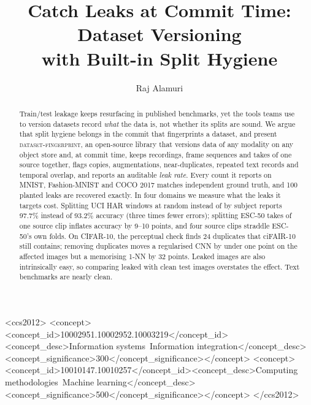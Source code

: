 \documentclass[sigconf,nonacm]{acmart}
\begin{document}
\title{Catch Leaks at Commit Time: Dataset Versioning\\with Built-in Split Hygiene}

\author{Raj Alamuri}

\begin{abstract}
Train/test leakage keeps resurfacing in published benchmarks, yet the tools teams use to version
datasets record \emph{what} the data is, not whether its splits are sound. We argue that split
hygiene belongs in the commit that fingerprints a dataset, and present \textsc{dataset-fingerprint},
an open-source library that versions data of any modality on any object store and, at commit time,
keeps recordings, frame sequences and takes of one source together, flags copies, augmentations,
near-duplicates, repeated text records and temporal overlap, and reports an auditable \emph{leak rate}.
Every count it reports on MNIST, Fashion-MNIST and COCO 2017 matches independent ground truth, and 100
planted leaks are recovered exactly. In four domains we measure what the leaks it targets cost.
Splitting UCI HAR windows at random instead of by subject reports 97.7\% instead of 93.2\% accuracy
(three times fewer errors); splitting ESC-50 takes of one source clip inflates accuracy by 9--10 points,
and four source clips straddle ESC-50's own folds. On CIFAR-10, the perceptual check finds 24 duplicates
that ciFAIR-10 still contains; removing duplicates moves a regularised CNN by under one point on the
affected images but a memorising 1-NN by 32 points. Leaked images are also intrinsically easy, so
comparing leaked with clean test images overstates the effect. Text benchmarks are nearly clean.
\end{abstract}

\begin{CCSXML}
<ccs2012>
<concept><concept_id>10002951.10002952.10003219</concept_id><concept_desc>Information systems~Information integration</concept_desc><concept_significance>300</concept_significance></concept>
<concept><concept_id>10010147.10010257</concept_id><concept_desc>Computing methodologies~Machine learning</concept_desc><concept_significance>500</concept_significance></concept>
</ccs2012>
\end{CCSXML}

\maketitle
\end{document}
